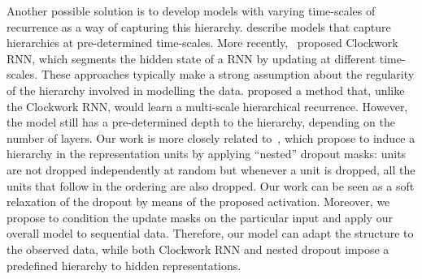\documentclass{article} \usepackage{iclr2019_conference,times}
\begin{document}
Another possible solution is to develop models with varying time-scales of recurrence as a way of capturing this hierarchy. \cite{el1996hierarchical, schmidhuber1991neural, lin1998learning} describe models that capture hierarchies at pre-determined time-scales.
More recently,~\cite{koutnik2014clockwork} proposed Clockwork RNN, which segments the hidden state of a RNN by updating at different time-scales.
These approaches typically make a strong assumption about the regularity of the hierarchy involved in modelling the data.
\cite{chung2016hierarchical} proposed a method that, unlike the Clockwork RNN, would learn a multi-scale hierarchical recurrence.
However, the model still has a pre-determined depth to the hierarchy, depending on the number of layers.
Our work is more closely related to~\cite{rippel2014learning}, which propose to induce a hierarchy in the representation units by applying ``nested'' dropout masks: units are not dropped independently at random but whenever a unit is dropped, all the units that follow in the ordering are also dropped. 
Our work can be seen as a soft relaxation of the dropout by means of the proposed  activation.
Moreover, we propose to condition the update masks on the particular input and apply our overall model to sequential data. Therefore, our model can adapt the structure to the observed data, while both Clockwork RNN and nested dropout impose a predefined hierarchy to hidden representations.


















 
\end{document}
